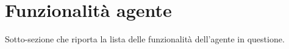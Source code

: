 \section{Funzionalità agente}

Sotto-sezione che riporta la lista delle funzionalità dell'agente in questione.
